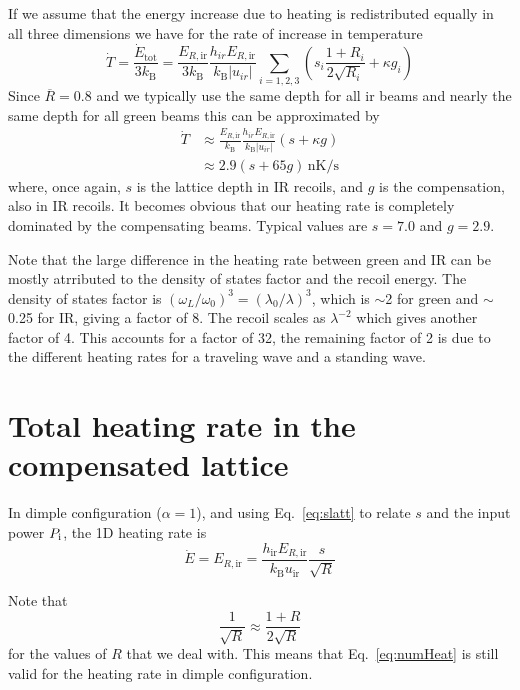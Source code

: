 If we assume that the energy increase due to heating is redistributed equally
in all three dimensions we have for the rate of increase in temperature 
\begin{equation}
\boxed{ 
  \dot{T} = \frac{\dot{E}_{\text{tot}}}{ 3k_{\text{B}}} = 
  \frac{E_{R,\text{ir}}}{ 3 k_{\text{B}} }  
 \frac{ h_{ir} E_{R,\text{ir}} }{k_{\text{B}}|u_{ir}|}
  \sum_{i=1,2,3} 
  \left(
  s_{i} \frac{1+R_{i}}{2\sqrt{R_{i}}}  + 
  \kappa g_{i} \right) }
\end{equation}
Since $\overline{R}=0.8$ and  we typically use the same depth for all ir
beams and nearly the same depth for all green beams this can be approximated
by 
\begin{equation}
\begin{split}
  \dot{T} & \approx  \frac{E_{R,\text{ir}}}{  k_{\text{B}} }  
 \frac{ h_{ir} E_{R,\text{ir}} }{k_{\text{B}}|u_{ir}|}
  \left(
  s  + 
  \kappa g\right) \\
   & \approx  2.9 ( s + 65 g) \,\text{nK/s} 
\end{split}
\label{eq:numHeat}
\end{equation}
where, once again, $s$ is the lattice depth in IR recoils, and $g$ is the
compensation, also in IR recoils. It becomes obvious that our heating rate is
completely dominated by the compensating beams.   Typical values are $s=7.0$
and $g=2.9$.

Note that the large difference in the heating rate between green and IR can be
mostly atrributed to the density of states factor and the recoil energy.   The
density of states factor is $(\omega_{L}/\omega_{0})^{3} =
(\lambda_{0}/\lambda)^{3}$, which is $\sim$2 for green and $\sim$0.25  for IR,
giving a factor of 8.   The recoil scales as $\lambda^{-2}$ which gives another
factor of 4.   This accounts for a factor of 32,  the remaining factor of 2 is
due to the different heating rates for a traveling wave and a standing wave.  

\section{Total heating rate in the compensated lattice}

In dimple configuration ($\alpha=1$), and using Eq.~\ref{eq:slatt} to relate $s$ and the input power $ P_{\text{i}}$, the 1D heating rate is 
\begin{equation}
  \dot{E} = E_{R,\text{ir}} = 
  \frac{ h_{\text{ir}} E_{R,\text{ir}} }{ k_{\text{B}} u_{\text{ir}} } 
  \frac{s}{\sqrt{R}} 
\end{equation}

Note that \[  \frac{1}{\sqrt{R}} \approx  \frac{1+R}{2\sqrt{R}} \] for the
values of $R$ that we deal with.   This means that Eq.~\ref{eq:numHeat} is
still valid for the heating rate in dimple configuration. 
